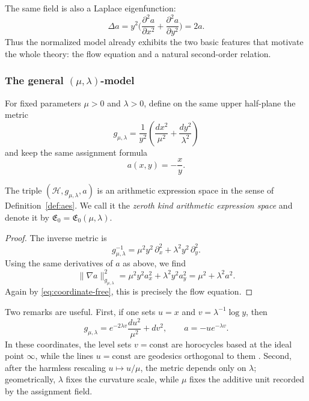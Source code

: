 The same field is also a Laplace eigenfunction:
\[
    \Delta a = y^2\Big(\frac{\partial^2 a}{\partial x^2} + \frac{\partial^2 a}{\partial y^2}\Big) = 2a.
\]
Thus the normalized model already exhibits the two basic features that motivate the whole theory: the flow equation and a natural second-order relation.

\subsubsection{The general \texorpdfstring{$(\mu,\lambda)$}{(mu,lambda)}-model}

For fixed parameters $\mu>0$ and $\lambda>0$, define on the same upper half-plane the metric
\[
    g_{\mu,\lambda}
    = \frac{1}{y^2}\left(\frac{dx^2}{\mu^2}+\frac{dy^2}{\lambda^2}\right)
\]
and keep the same assignment formula
\begin{equation}\label{eq:genassignment}
    a(x,y) = -\frac{x}{y}.
\end{equation}

\begin{theorem}\label{thm:generalE1}
The triple $(\mathcal H,g_{\mu,\lambda},a)$ is an arithmetic expression space in the sense of Definition~\ref{def:aes}. We call it the \emph{zeroth kind arithmetic expression space} and denote it by $\mathfrak{E}_0=\mathfrak{E}_0(\mu,\lambda)$.
\end{theorem}

\begin{proof}
The inverse metric is
\[
    g_{\mu,\lambda}^{-1}
    = \mu^2 y^2\,\partial_x^2 + \lambda^2 y^2\,\partial_y^2.
\]
Using the same derivatives of $a$ as above, we find
\[
    \|\nabla a\|_{g_{\mu,\lambda}}^2
    = \mu^2 y^2 a_x^2 + \lambda^2 y^2 a_y^2
    = \mu^2 + \lambda^2 a^2.
\]
Again by \eqref{eq:coordinate-free}, this is precisely the flow equation.
\end{proof}

Two remarks are useful.
First, if one sets $u=x$ and $v=\lambda^{-1}\log y$, then
\begin{equation}\label{eq:exmp2}
    g_{\mu,\lambda} = e^{-2\lambda v}\frac{du^2}{\mu^2}+dv^2,
    \qquad
    a = -u e^{-\lambda v}.
\end{equation}
In these coordinates, the level sets $v=\text{const}$ are horocycles based at the ideal point $\infty$, while the lines $u=\text{const}$ are geodesics orthogonal to them \cite{Beardon1983DiscreteGroups}. Second, after the harmless rescaling $u\mapsto u/\mu$, the metric depends only on $\lambda$; geometrically, $\lambda$ fixes the curvature scale, while $\mu$ fixes the additive unit recorded by the assignment field.

